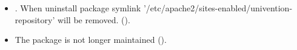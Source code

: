 \begin{itemize}
\item {}. When uninstall package symlink
'/etc/apache2/sites-enabled/univention-repository' will be removed.
().

\item The package  is not longer maintained
().

\end{itemize}

